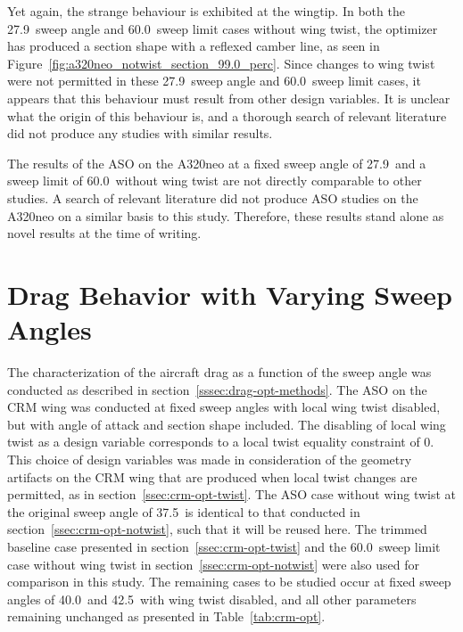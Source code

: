 Yet again, the strange behaviour is exhibited at the wingtip. In both the 27.9\degree\ sweep angle and 60.0\degree\ sweep limit cases without wing twist, the optimizer has produced a section shape with a reflexed camber line, as seen in Figure~\ref{fig:a320neo_notwist_section_99.0_perc}. 
Since changes to wing twist were not permitted in these 27.9\degree\ sweep angle and 60.0\degree\ sweep limit cases, it appears that this behaviour must result from other design variables. It is unclear what the origin of this behaviour is, and a thorough search of relevant literature did not produce any studies with similar results.

The results of the ASO on the A320neo at a fixed sweep angle of 27.9\degree\ and a sweep limit of 60.0\degree\ without wing twist are not directly comparable to other studies. A search of relevant literature did not produce ASO studies on the A320neo on a similar basis to this study. Therefore, these results stand alone as novel results at the time of writing. 

\section{Drag Behavior with Varying Sweep Angles}
\label{sec:crm-drag-trends}
The characterization of the aircraft drag as a function of the sweep angle was conducted as described in section~\ref{sssec:drag-opt-methods}. The ASO on the CRM wing was conducted at fixed sweep angles with local wing twist disabled, but with angle of attack and section shape included. The disabling of local wing twist as a design variable corresponds to a local twist equality constraint of 0\degree. This choice of design variables was made in consideration of the geometry artifacts on the CRM wing that are produced when local twist changes are permitted, as in section~\ref{ssec:crm-opt-twist}. The ASO case without wing twist at the original sweep angle of 37.5\degree\ is identical to that conducted in section~\ref{ssec:crm-opt-notwist}, such that it will be reused here. The trimmed baseline case presented in section~\ref{ssec:crm-opt-twist} and the 60.0\degree\ sweep limit case without wing twist in section~\ref{ssec:crm-opt-notwist} were also used for comparison in this study. The remaining cases to be studied occur at fixed sweep angles of 40.0\degree\ and 42.5\degree\ with wing twist disabled, and all other parameters remaining unchanged as presented in Table~\ref{tab:crm-opt}.

